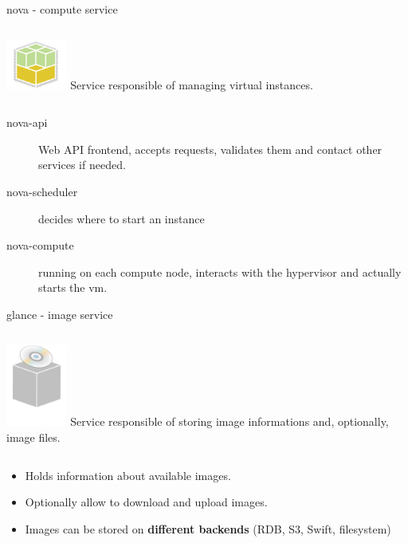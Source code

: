 \documentclass[english,serif,mathserif,usenames,dvipsnames]{beamer}
\begin{document}
\begin{frame}
  {nova - compute service}
  \begin{columns}
    \column{2cm}
    \includegraphics[width=2cm]{openstack-compute-icon.png}
    \column{8cm}
    Service responsible of managing virtual instances.
  \end{columns}
  \begin{description}
  \item[nova-api] Web API frontend, accepts requests, validates them
    and contact other services if needed.
  \item[nova-scheduler] decides where to start an instance
  \item[nova-compute] running on each compute node, interacts with the
    hypervisor and actually starts the vm.
  \end{description}
\end{frame}

\begin{frame}
  {glance - image service}
  \begin{columns}
    \column{2cm}
    \includegraphics[width=2cm]{glance-icon.png}
    \column{8cm}
    Service responsible of storing image informations and, optionally,
    image files.
  \end{columns}

  \+
  \begin{itemize}
  \item Holds information about available images.
  \item Optionally allow to download and upload images.
  \item Images can be stored on \textbf{different backends} (RDB, S3,
    Swift, filesystem)
  \end{itemize}
\end{frame}
\end{document}
